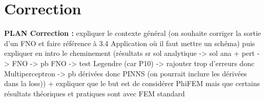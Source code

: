 \section{Correction} \label{Corr}
\graphicspath{{images/corr}}

\textbf{PLAN Correction :} expliquer le contexte général (on souhaite corriger la sortie d'un FNO et faire référence à 3.4 Application où il faut mettre un schéma) puis expliquer en intro le cheminement (résultats sr sol analytique -> sol ana + pert -> FNO -> pb FNO -> test Legendre (car P10) -> rajouter trop d'erreurs donc Multiperceptron -> pb dérivées donc PINNS (on pourrait inclure les dérivées dans la loss)) + expliquer que le but est de considérer PhiFEM mais que certains résultats théoriques et pratiques sont avec FEM standard 



